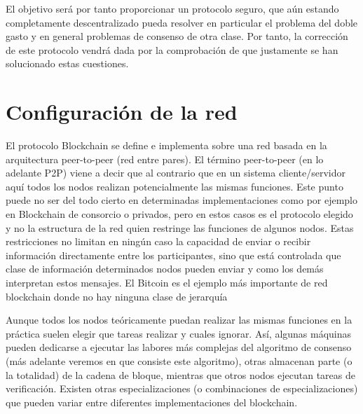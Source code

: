 El objetivo será por tanto proporcionar un protocolo seguro, que aún estando completamente descentralizado pueda resolver en particular el problema del doble gasto y en general problemas de consenso de otra clase. Por tanto, la corrección de este protocolo vendrá dada por la comprobación de que justamente se han solucionado estas cuestiones.

\section{Configuración de la red}
El protocolo Blockchain se define e implementa sobre una red basada en la arquitectura peer-to-peer (red entre pares). El término peer-to-peer (en lo adelante P2P) viene a decir que al contrario que en un sistema cliente/servidor aquí todos los nodos realizan potencialmente las mismas funciones. Este punto puede no ser del todo cierto en determinadas implementaciones como por ejemplo en Blockchain de consorcio o privados, pero en estos casos es el protocolo elegido y no la estructura de la red quien restringe las funciones de algunos nodos. Estas restricciones no limitan en ningún caso la capacidad de enviar o recibir información directamente entre los participantes, sino que está controlada que clase de información determinados nodos pueden enviar y como los demás interpretan estos mensajes. El Bitcoin es el ejemplo más importante de red blockchain donde no hay ninguna clase de jerarquía 

Aunque todos los nodos teóricamente puedan realizar las mismas funciones en la práctica suelen elegir que tareas realizar y cuales ignorar. Así, algunas máquinas pueden dedicarse a ejecutar las labores más complejas del algoritmo de consenso (más adelante veremos en que consiste este algoritmo), otras  almacenan parte (o la totalidad) de la cadena de bloque, mientras que otros nodos ejecutan tareas de verificación. Existen otras especializaciones (o combinaciones de especializaciones) que pueden variar entre diferentes implementaciones del blockchain.

